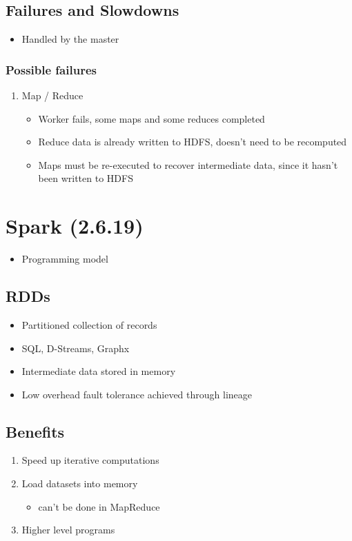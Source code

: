 \documentclass[11pt]{article}
\begin{document}
\subsection{Failures and Slowdowns}
\label{sec:orgheadline3}
\begin{itemize}
\item Handled by the master
\end{itemize}
\subsubsection{Possible failures}
\label{sec:orgheadline2}
\begin{enumerate}
\item Map / Reduce
\begin{itemize}
\item Worker fails, some maps and some reduces completed
\item Reduce data is already written to HDFS, doesn't need to be recomputed
\item Maps must be re-executed to recover intermediate data, since it hasn't been written to HDFS
\end{itemize}
\end{enumerate}

\section{Spark (2.6.19)}
\label{sec:orgheadline8}
\begin{itemize}
\item Programming model
\end{itemize}

\subsection{RDDs}
\label{sec:orgheadline5}
\begin{itemize}
\item Partitioned collection of records
\item SQL, D-Streams, Graphx
\item Intermediate data stored in memory
\item Low overhead fault tolerance achieved through lineage
\end{itemize}

\subsection{Benefits}
\label{sec:orgheadline6}
\begin{enumerate}
\item Speed up iterative computations
\item Load datasets into memory
\begin{itemize}
\item can't be done in MapReduce
\end{itemize}

\item Higher level programs
\end{enumerate}
\end{document}
